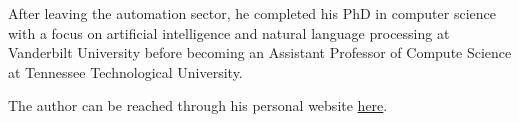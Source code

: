 \documentclass{book}
\begin{document}
After leaving the automation sector, he completed his PhD in computer science with a focus on artificial intelligence and natural language processing at Vanderbilt University before becoming an Assistant Professor of Compute Science at Tennessee Technological University.

The author can be reached through his personal website \href{http://www.jessetnroberts.com}{here}.

\setcounter{tocdepth}{3}
\tableofcontents

\mainmatter


















\backmatter
{}
\printindex
\end{document}
